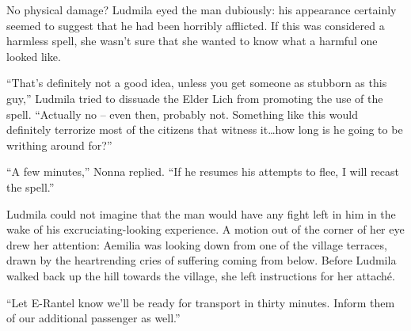 

No physical damage? Ludmila eyed the man dubiously: his appearance certainly seemed to suggest that he had been horribly afflicted. If this was considered a harmless spell, she wasn’t sure that she wanted to know what a harmful one looked like.

 

“That’s definitely not a good idea, unless you get someone as stubborn as this guy,” Ludmila tried to dissuade the Elder Lich from promoting the use of the spell. “Actually no – even then, probably not. Something like this would definitely terrorize most of the citizens that witness it…how long is he going to be writhing around for?”

 

“A few minutes,” Nonna replied. “If he resumes his attempts to flee, I will recast the spell.”

 

Ludmila could not imagine that the man would have any fight left in him in the wake of his excruciating-looking experience. A motion out of the corner of her eye drew her attention: Aemilia was looking down from one of the village terraces, drawn by the heartrending cries of suffering coming from below. Before Ludmila walked back up the hill towards the village, she left instructions for her attaché.

 

“Let E-Rantel know we’ll be ready for transport in thirty minutes. Inform them of our additional passenger as well.”